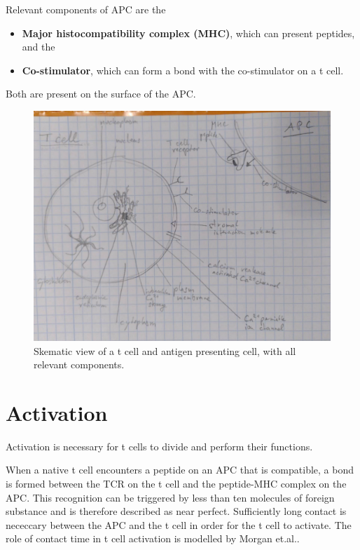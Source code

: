 Relevant components of APC are the
\begin{itemize}
	\item \textbf{Major histocompatibility complex (MHC)}, which can present peptides, and the
	\item \textbf{Co-stimulator}, which can form a bond with the co-stimulator on a t cell.
\end{itemize}

Both are present on the surface of the APC.

\begin{figure}
	\centering
	\includegraphics[width=\linewidth]{fig/tmp_t_cell_components}
	\caption{Skematic view of a t cell and antigen presenting cell, with all relevant components.}
	\label{fig:tcellcomponents}
\end{figure}

\section{Activation}

Activation is necessary for t cells to divide and perform their functions.\cite{Ganong1997}

When a native t cell encounters a peptide on an APC that is compatible, a bond is formed between the TCR on the t cell and the peptide-MHC complex on the APC. This recognition can be triggered by less than ten molecules of foreign substance and is therefore described as near perfect. Sufficiently long contact is nececcary between the APC and the t cell in order for the t cell to activate. The role of contact time in t cell activation is modelled by Morgan et.al.\cite{morgan2023}.

